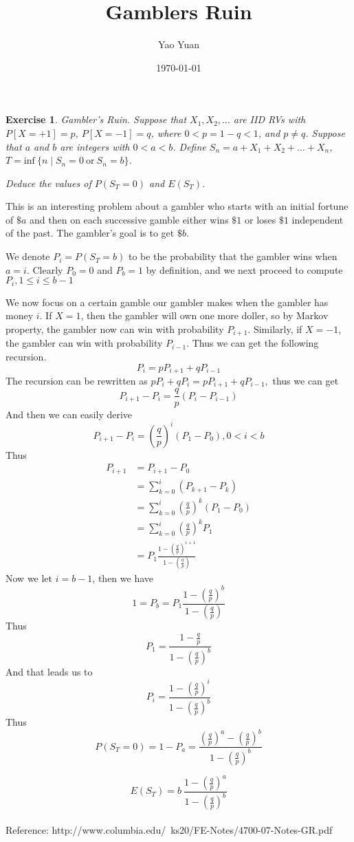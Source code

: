 \documentclass{article}
\title{Gamblers Ruin}
\author{Yao Yuan}
\date{\today}
\newtheorem{exercise}[theorem]{Exercise}
\begin{document}
\maketitle

\begin{tcolorbox}
    \begin{exercise} 
        Gambler's Ruin.
        Suppose that $X_1, X_2, ...$ are IID RVs with $P[X = +1] = p$, $P[X = -1] = q$, where $0 < p = 1 - q < 1$, and $p \neq q$.
        Suppose that $a$ and $b$ are integers with $0 < a < b$.
        Define $S_n = a + X_1 + X_2 + ... + X_n$, $T = \text{inf}~\{n \mid S_n = 0 ~\text{or}~ S_n = b\}$.

        Deduce the values of $P(S_T = 0)$ and $E(S_T)$.
    \end{exercise} 
\end{tcolorbox}

This is an interesting problem about a gambler who starts with an initial fortune of $\$ a$ and then on each successive gamble either wins $\$ 1$ or loses $\$ 1$ independent of the past. The gambler's goal is to get $\$ b$. 

We denote $P_i = P(S_T = b)$ to be the probability that the gambler wins when $a = i$. Clearly $P_{0}=0$ and $P_{b}=1$ by definition, and we next proceed to compute $P_{i}, 1 \leq i \leq b-1$

We now focus on a certain gamble our gambler makes when the gambler has money $i$. If $X = 1$, then the gambler will own one more doller, so by Markov property, the gambler now can win with probability $P_{i + 1}$. Similarly, if $X = -1$, the gambler can win with probability $P_{i - 1}$. Thus we can get the following recursion.
\[
    P_{i}=p P_{i+1}+q P_{i-1}
\]
The recursion can be rewritten as $p P_{i}+q P_{i}=p P_{i+1}+q P_{i-1},$ thus we can get
\[
    P_{i+1}-P_{i}=\frac{q}{p}\left(P_{i}-P_{i-1}\right)
\]
And then we can easily derive
\[
    P_{i+1}-P_{i} = (\frac{q}{p})^i (P_1 - P_0), 0 < i < b
\]
Thus
\[
    \begin{aligned}
    P_{i+1} & = P_{i+1} - P_0 \\
            & = \sum_{k = 0}^{i}\left(P_{k+1}-P_{k}\right) \\
            & = \sum_{k = 0}^{i}\left(\frac{q}{p}\right)^{k} (P_1 - P_0) \\
            & = \sum_{k = 0}^{i}\left(\frac{q}{p}\right)^{k} P_1 \\
            & = P_1 \frac{1 - (\frac{q}{p}) ^ {i + 1}} {1 - (\frac{q}{p})} 
    \end{aligned}
\]
Now we let $i = b - 1$, then we have
\[
    1 = P_b = P_1 \frac{1 - (\frac{q}{p}) ^ {b}} {1 - (\frac{q}{p})} 
\]
Thus
\[
    P_1 = \frac{1 - \frac{q}{p}} {1 - (\frac{q}{p}) ^ b}
\]
And that leads us to
\[
    P_i = \frac{1 - (\frac{q}{p}) ^ i} {1 - (\frac{q}{p}) ^ b}
\]
Thus
\[
    P(S_T = 0) = 1 - P_a = \frac{(\frac{q}{p}) ^ a - (\frac{q}{p}) ^ b} {1 - (\frac{q}{p}) ^ b}
\]

\[
    E(S_T) = b~\frac{1 - (\frac{q}{p}) ^ a} {1 - (\frac{q}{p}) ^ b}
\]
\\
Reference: http://www.columbia.edu/~ks20/FE-Notes/4700-07-Notes-GR.pdf
\end{document}
